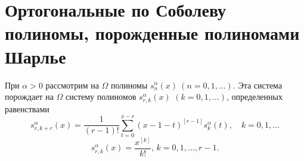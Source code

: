 \section{Ортогональные по Соболеву полиномы, порожденные полиномами Шарлье}

При $\alpha>0$ рассмотрим на $\Omega$ полиномы $s_n^\alpha(x)\ (n=0,1,\ldots)$. Эта система порождает на $\Omega$ систему полиномов $s_{r,k}^{\alpha}(x)$ $(k=0, 1,\ldots)$, определенных равенствами
\begin{equation}\label{Shar_eq19}
s_{r,k+r}^{\alpha}(x)=\frac{1}{(r-1)!} \sum_{t=0}^{x-r}(x-1-t)^{[r-1]}s_{k}^{\alpha}(t), \quad k=0,1,\ldots
\end{equation}
\begin{equation}\label{Shar_eq20}
s_{r,k}^{\alpha}(x)=\frac{x^{[k]}}{k!},\, k=0,1,\ldots,r-1.
\end{equation}

